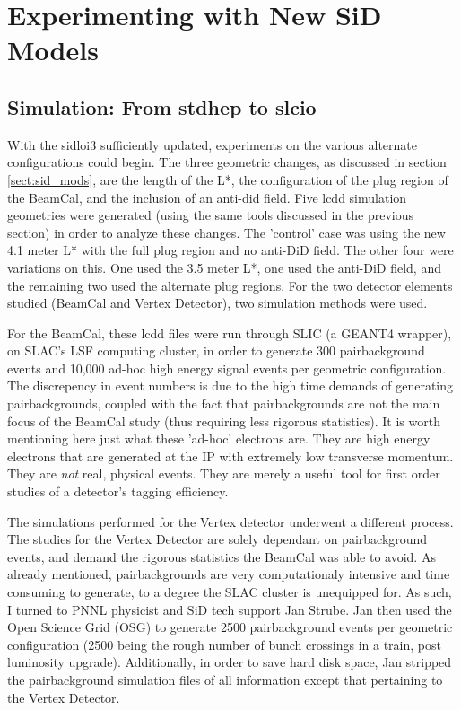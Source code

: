 \documentclass{report}
\begin{document}
        \section{Experimenting with New SiD Models}

            \subsection{Simulation: From stdhep to slcio}
                With the sidloi3 sufficiently updated, experiments on the various alternate configurations could begin. The three geometric changes, as discussed in section \ref{sect:sid_mods}, are the length of the L*, the configuration of the plug region of the BeamCal, and the inclusion of an anti-did field. Five lcdd simulation geometries were generated (using the same tools discussed in the previous section) in order to analyze these changes. The 'control' case was using the new 4.1 meter L* with the full plug region and no anti-DiD field. The other four were variations on this. One used the 3.5 meter L*, one used the anti-DiD field, and the remaining two used the alternate plug regions. For the two detector elements studied (BeamCal and Vertex Detector), two simulation methods were used. 

                For the BeamCal, these lcdd files were run through SLIC (a GEANT4 wrapper), on SLAC's LSF computing cluster, in order to generate 300 pairbackground events and 10,000 ad-hoc high energy signal events per geometric configuration. The discrepency in event numbers is due to the high time demands of generating pairbackgrounds, coupled with the fact that pairbackgrounds are not the main focus of the BeamCal study (thus requiring less rigorous statistics). It is worth mentioning here just what these 'ad-hoc' electrons are. They are high energy electrons that are generated at the IP with extremely low transverse momentum. They are \textit{not} real, physical events. They are merely a useful tool for first order studies of a detector's tagging efficiency.

                The simulations performed for the Vertex detector underwent a different process. The studies for the Vertex Detector are solely dependant on pairbackground events, and demand the rigorous statistics the BeamCal was able to avoid. As already mentioned, pairbackgrounds are very computationaly intensive and time consuming to generate, to a degree the SLAC cluster is unequipped for. As such, I turned to PNNL physicist and SiD tech support Jan Strube. Jan then used the Open Science Grid (OSG) to generate 2500 pairbackground events per geometric configuration (2500 being the rough number of bunch crossings in a train, post luminosity upgrade). Additionally, in order to save hard disk space, Jan stripped the pairbackground simulation files of all information except that pertaining to the Vertex Detector. 
\end{document}

